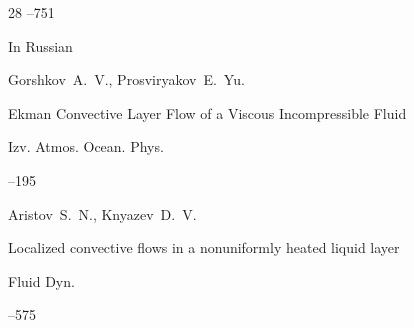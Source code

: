 \begin{thebibliography}{28}
--751





\lang In Russian




\by Gorshkov~A.~V., Prosviryakov~E.~Yu.

\paper Ekman Convective Layer Flow of a Viscous Incompressible Fluid

\jour Izv. Atmos. Ocean. Phys.




–195







\by Aristov~S.~N., Knyazev~D.~V.

\paper Localized convective flows in a nonuniformly heated liquid layer

\jour Fluid Dyn.




--575












\end{thebibliography}





\renewcommand{\baselinestretch}{0.95}



\newpage






$\;$







